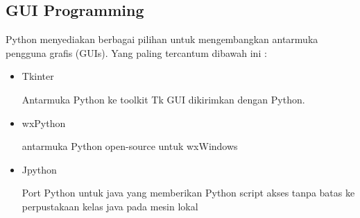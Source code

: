 \documentclass{wileySix}
\begin{document}
\begin{myEnumerate}
\begin{myEnumerate}
{\chapter{GUI Programming}
\par
\vspace{12pt}
Python menyediakan berbagai pilihan untuk mengembangkan antarmuka pengguna grafis (GUIs). Yang paling tercantum dibawah ini : \par
\noindent 
\begin{itemize}
	\item Tkinter \par
	Antarmuka Python ke toolkit Tk GUI dikirimkan dengan Python.  \par
	\noindent 
	\item wxPython \par
	antarmuka Python open-source untuk wxWindows \par
	\noindent 
	\item Jpython \par
	Port Python untuk java yang memberikan Python script akses tanpa batas ke perpustakaan kelas java pada mesin lokal \par
	\vspace{12pt}
	\noindent 
	

\end{itemize}}
\end{myEnumerate}
\end{myEnumerate}
\end{document}
